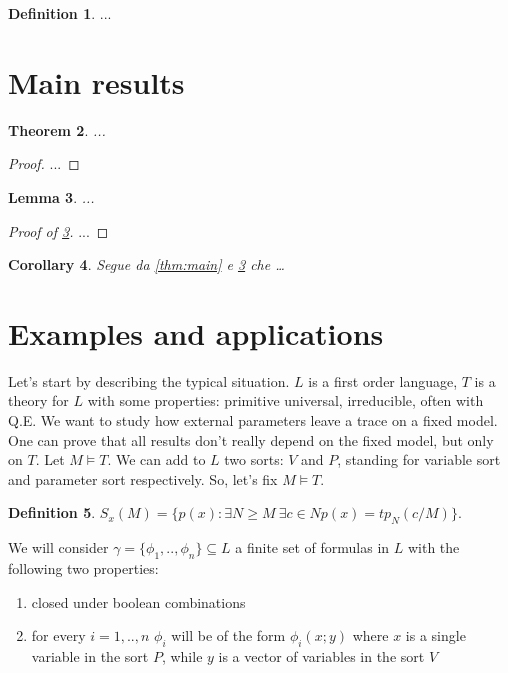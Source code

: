 \documentclass[11pt,a4paper]{article}
\theoremstyle{plain}
\newtheorem{theorem}{Theorem}[section]
\newtheorem{lemma}[theorem]{Lemma}
\newtheorem{corollary}[theorem]{Corollary}
\theoremstyle{definition}
\newtheorem{definition}[theorem]{Definition}
\begin{document}
\begin{definition}\label{def:chiave}
...
\end{definition}

\section{Main results}
\label{sec:main}

\begin{theorem}
...
\end{theorem}

\begin{proof}
...
\end{proof}

\begin{lemma}\label{lem:aux}
...
\end{lemma}

\begin{proof}[Proof of \cref{lem:aux}]
...
\end{proof}

\begin{corollary}\label{cor:conseguenza}
Segue da \cref{thm:main} e \cref{lem:aux} che \dots
\end{corollary}

\section{Examples and applications}
\label{sec:examples}

Let's start by describing the typical situation.
$L$ is a first order language, $T$ is a theory for $L$ with some properties: primitive universal, irreducible, often with Q.E.
We want to study how external parameters leave a trace on a fixed model. One can prove that all results don't really depend on the fixed model, but only on $T$.
Let $M \models T$. We can add to $L$ two sorts: $V$ and $P$, standing for variable sort and parameter sort respectively. 
So, let's fix $M \models T$. 
\begin{definition}
	$S_x(M) = \{p(x) : \exists N \geq M \ \exists c \in N p(x) = tp_N(c/M)\}$.
\end{definition}

We will consider $\gamma = \{\phi_1,..,\phi_n \} \subseteq L$ a finite set of formulas in $L$ with the following two properties:
\begin{enumerate}
	\item	closed under boolean combinations
	\item	for every $i = 1,..,n$ $\phi_i$ will be of the form $\phi_i(x;y)$ where $x$ is a single variable in the sort $P$, 
		while $y$ is a vector of variables in the sort $V$   
\end{enumerate}
\end{document}
